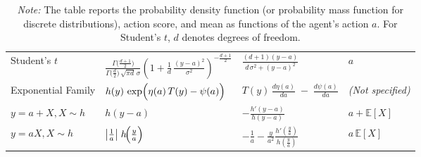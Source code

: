 \begin{table}[ht]
{\begin{tabular}{l p{5.5cm} p{3.8cm} p{3.8cm}}
        Student's \(t\)
        & \( 
        \frac{\Gamma\!\bigl(\tfrac{d + 1}{2}\bigr)}{\Gamma\!\bigl(\tfrac{d}{2}\bigr)\,\sqrt{\pi d}\,\sigma}
        \left(1 + \frac{1}{d} \,\frac{(y - a)^2}{\sigma^2}\right)^{-\tfrac{d + 1}{2}}
        \) 
        & \( \frac{(d+1)(y-a)}{d\,\sigma^2 + (y-a)^2} \)
        & \( a \) 
        \\ 

        Exponential Family
        & \( h(y)\,\exp\Bigl(\eta(a)\,T(y) - \psi(a)\Bigr) \)
        & \( T(y)\,\frac{d\eta(a)}{da} \;-\; \frac{d\psi(a)}{da} \)
        & \textit{(Not specified)} 
        \\ 

        \( y = a + X, X \sim h \)
        & \( h(y - a) \)
        & \( -\frac{h'(y - a)}{h(y - a)} \)
        & \( a + \mathbb{E}[X] \) 
        \\ 

        \( y = a X, X \sim h \)
        & \( \bigl|\tfrac{1}{a}\bigr|\;h\!\Bigl(\tfrac{y}{a}\Bigr) \)
        & \( -\frac{1}{a} - \frac{y}{a^2} \frac{h'(\frac{y}{a})}{h(\frac{y}{a})} \)
        & \( a \,\mathbb{E}[X] \)
        \\ 
        \bottomrule
    \end{tabular}
    } %
    \captionsetup{font=footnotesize} %
    \caption*{\textit{Note:} The table reports the probability density function (or probability mass function for discrete distributions), action score, and mean as functions of the agent's action $a$.  For Student's $t$, $d$ denotes degrees of freedom.}
\end{table}

